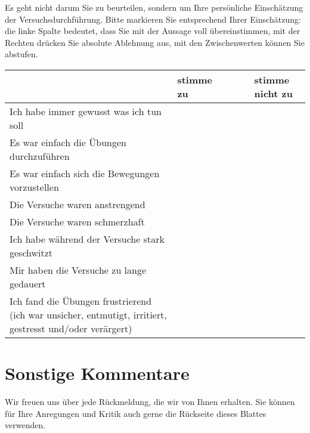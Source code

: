 \documentclass{article}
\begin{document}
Es geht nicht darum Sie zu beurteilen, sondern um Ihre pers\"onliche Einsch\"atzung der Versuchsdurchf\"uhrung.
Bitte markieren Sie entsprechend Ihrer Einschätzung: die linke Spalte bedeutet, dass Sie mit der Aussage voll \"ubereinstimmen, mit der Rechten dr\"ucken Sie absolute Ablehnung aus, mit den Zwischenwerten k\"onnen Sie abstufen.
\begin{center}
  \begin{tabular}{ |p{} |  p{} | p{} | p{} | p{} | p{} |  }
    \hline
     & stimme zu & & & & stimme nicht zu \\ \hline
	Ich habe immer gewusst was ich tun soll  & & & & &\\ \hline
	Es war einfach die \"Ubungen durchzuf\"uhren  & & & & &\\ \hline
    Es war einfach sich die Bewegungen vorzustellen  & & & & &\\ \hline
    Die Versuche waren anstrengend & & & & &\\ \hline    
    Die Versuche waren schmerzhaft & & & & &\\ \hline
    Ich habe w\"ahrend der Versuche stark geschwitzt & & & & & \\ \hline
    Mir haben die Versuche zu lange gedauert & & & & & \\ \hline
    Ich fand die \"Ubungen frustrierend (ich war unsicher, entmutigt, irritiert, gestresst und/oder verärgert) & & & & & \\ \hline
  \end{tabular}
\end{center}





\section{Sonstige Kommentare}
Wir freuen uns \"uber jede R\"uckmeldung, die wir von Ihnen erhalten.
Sie k\"onnen f\"ur Ihre Anregungen und Kritik auch gerne die R\"uckseite dieses Blattes verwenden.
\end{document}
